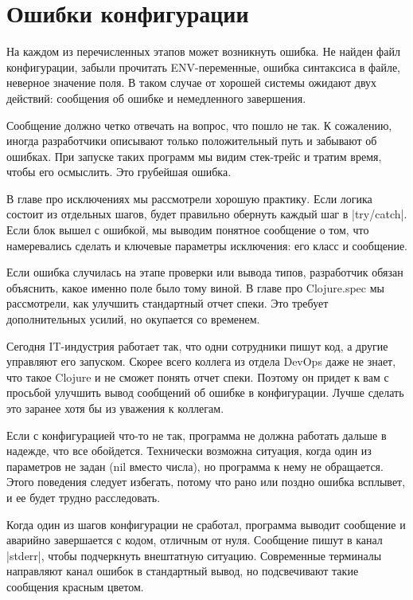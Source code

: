 \section{Ошибки конфигурации}

На каждом из перечисленных этапов может возникнуть ошибка. Не найден файл
конфигурации, забыли прочитать ENV-переменные, ошибка синтаксиса в файле,
неверное значение поля. В таком случае от хорошей системы ожидают двух действий:
сообщения об ошибке и немедленного завершения.

Сообщение должно четко отвечать на вопрос, что пошло не так. К сожалению, иногда
разработчики описывают только положительный путь и забывают об ошибках. При
запуске таких программ мы видим стек-трейс и тратим время, чтобы его
осмыслить. Это грубейшая ошибка.

В главе про исключениях мы рассмотрели хорошую практику. Если логика состоит из
отдельных шагов, будет правильно обернуть каждый шаг в \spverb|try/catch|. Если блок
вышел с ошибкой, мы выводим понятное сообщение о том, что намеревались сделать и
ключевые параметры исключения: его класс и сообщение.

Если ошибка случилась на этапе проверки или вывода типов, разработчик обязан
объяснить, какое именно поле было тому виной. В главе про Clojure.spec мы
рассмотрели, как улучшить стандартный отчет спеки. Это требует дополнительных
усилий, но окупается со временем.

Сегодня IT-индустрия работает так, что одни сотрудники пишут код, а другие
управляют его запуском. Скорее всего коллега из отдела DevOps даже не знает, что
такое Clojure и не сможет понять отчет спеки. Поэтому он придет к вам с просьбой
улучшить вывод сообщений об ошибке в конфигурации. Лучше сделать это заранее
хотя бы из уважения к коллегам.

Если с конфигурацией что-то не так, программа не должна работать дальше в
надежде, что все обойдется. Технически возможна ситуация, когда один из
параметров не задан (nil вместо числа), но программа к нему не обращается. Этого
поведения следует избегать, потому что рано или поздно ошибка всплывет, и ее
будет трудно расследовать.

Когда один из шагов конфигурации не сработал, программа выводит сообщение и
аварийно завершается с кодом, отличным от нуля. Сообщение пишут в канал
\spverb|stderr|, чтобы подчеркнуть внештатную ситуацию. Современные терминалы
направляют канал ошибок в стандартный вывод, но подсвечивают такие сообщения
красным цветом.

